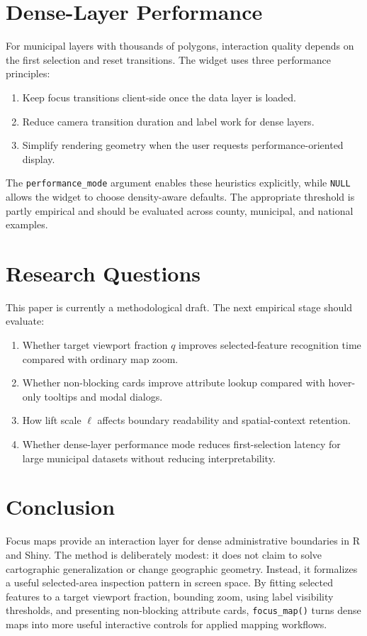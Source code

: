 \documentclass[12pt, a4paper]{article}
\numberwithin{equation}{section}
\begin{document}
\section{Dense-Layer Performance}

For municipal layers with thousands of polygons, interaction quality depends on the first selection and reset transitions. The widget uses three performance principles:
\begin{enumerate}
  \item Keep focus transitions client-side once the data layer is loaded.
  \item Reduce camera transition duration and label work for dense layers.
  \item Simplify rendering geometry when the user requests performance-oriented display.
\end{enumerate}

The \texttt{performance\_mode} argument enables these heuristics explicitly, while \texttt{NULL} allows the widget to choose density-aware defaults. The appropriate threshold is partly empirical and should be evaluated across county, municipal, and national examples.

\section{Research Questions}

This paper is currently a methodological draft. The next empirical stage should evaluate:
\begin{enumerate}
  \item Whether target viewport fraction $q$ improves selected-feature recognition time compared with ordinary map zoom.
  \item Whether non-blocking cards improve attribute lookup compared with hover-only tooltips and modal dialogs.
  \item How lift scale $\ell$ affects boundary readability and spatial-context retention.
  \item Whether dense-layer performance mode reduces first-selection latency for large municipal datasets without reducing interpretability.
\end{enumerate}

\section{Conclusion}

Focus maps provide an interaction layer for dense administrative boundaries in \textsf{R} and Shiny. The method is deliberately modest: it does not claim to solve cartographic generalization or change geographic geometry. Instead, it formalizes a useful selected-area inspection pattern in screen space. By fitting selected features to a target viewport fraction, bounding zoom, using label visibility thresholds, and presenting non-blocking attribute cards, \texttt{focus\_map()} turns dense maps into more useful interactive controls for applied mapping workflows.
\end{document}
